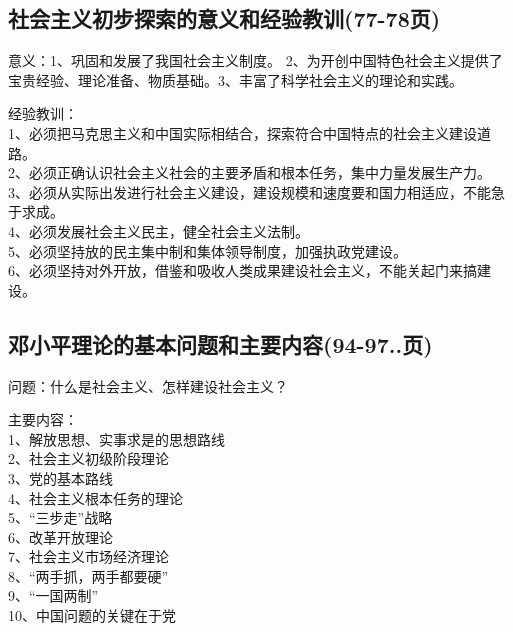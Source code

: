 \documentclass[cn,11pt]{elegantbook}
\begin{document}
\subsection{社会主义初步探索的意义和经验教训(77-78页)}
{\large 
{\heiti 意义：}1、巩固和发展了我国社会主义制度。
2、为开创中国特色社会主义提供了宝贵经验、理论准备、物质基础。3、丰富了科学社会主义的理论和实践。

{\heiti 经验教训：}\\
1、必须把马克思主义和中国实际相结合，探索符合中国特点的社会主义建设道路。\\
2、必须正确认识社会主义社会的主要矛盾和根本任务，集中力量发展生产力。\\
3、必须从实际出发进行社会主义建设，建设规模和速度要和国力相适应，不能急于求成。\\
4、必须发展社会主义民主，健全社会主义法制。\\
5、必须坚持放的民主集中制和集体领导制度，加强执政党建设。\\
6、必须坚持对外开放，借鉴和吸收人类成果建设社会主义，不能关起门来搞建设。


}
\subsection{邓小平理论的基本问题和主要内容(94-97..页)}
{\large 
{\heiti 问题：}什么是社会主义、怎样建设社会主义？

{\heiti 主要内容：}\\1、解放思想、实事求是的思想路线\\
2、社会主义初级阶段理论\\
3、党的基本路线\\
4、社会主义根本任务的理论\\
5、“三步走”战略\\
6、改革开放理论\\
7、社会主义市场经济理论\\
8、“两手抓，两手都要硬”\\
9、“一国两制”\\
10、中国问题的关键在于党\\

}
\end{document}
